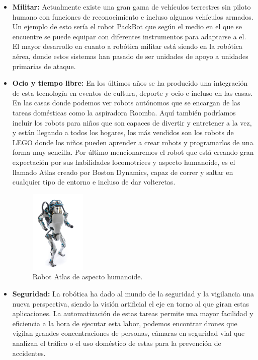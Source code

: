 \begin{itemize}
		\item \textbf{Militar: } Actualmente existe una gran gama de vehículos terrestres sin piloto humano con funciones de reconocimiento e incluso algunos vehículos armados. Un ejemplo de esto sería el robot PackBot que según el medio en el que se encuentre se puede equipar con diferentes instrumentos para adaptarse a el. El mayor desarrollo en cuanto a robótica militar está siendo en la robótica aérea, donde estos sistemas han pasado de ser unidades de apoyo a unidades primarias de ataque.
		\item \textbf{Ocio y tiempo libre: }En los últimos años se ha producido una integración de esta tecnología en eventos de cultura, deporte y ocio e incluso en las casas. En las casas donde podemos ver robots autónomos que se encargan de las tareas domésticas como la aspiradora Roomba. Aquí también podríamos incluir los robots para niños que son capaces de divertir y entretener a la vez, y están llegando a todos los hogares, los más vendidos son los robots de LEGO donde los niños pueden aprender a crear robots y programarlos de una forma muy sencilla. Por último mencionaremos el robot que está creando gran expectación por sus habilidades locomotrices y aspecto humanoide, es el llamado Atlas creado por Boston Dynamics, capaz de correr y saltar en cualquier tipo de entorno e incluso de dar volteretas.
				
		\begin{figure}[H]
			\begin{center}
				\includegraphics[width=0.25\textwidth]{imag/IMG29.jpg}
					\caption{Robot Atlas de aspecto humanoide.}
			\label{fig:Robot Atlas.}	
			\end{center}
		\end{figure}
		
		\item \textbf{Seguridad: }La robótica ha dado al mundo de la seguridad y la vigilancia una nueva perspectiva, siendo la visión artificial el eje en torno al que giran estas aplicaciones. La automatización de estas tareas permite una mayor facilidad y eficiencia a la hora de ejecutar esta labor, podemos encontrar drones que vigilan grandes concentraciones de personas, cámaras en seguridad vial que analizan el tráfico o el uso doméstico de estas para la prevención de accidentes.
\end{itemize}

